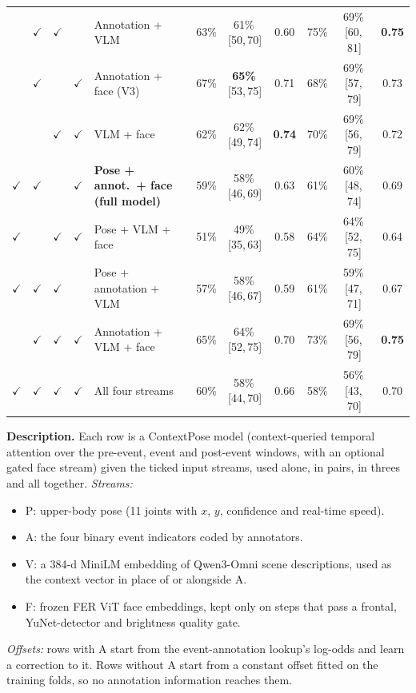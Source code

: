 \documentclass[11pt]{article}
\newcommand{\best}[1]{\textbf{#1}}
\newcommand{\ci}[2]{\,[#1,\,#2]}
\newcommand{\tabledesc}[1]{\par\medskip\begin{minipage}{\linewidth}\footnotesize\textbf{Description.} #1\end{minipage}}
\begin{document}
\begin{table}[!htbp]
{\begin{tabular}{cccclcccccc}
 & $\checkmark$ & $\checkmark$ & & Annotation + VLM & 63\% & 61\%\ci{50}{70} & 0.60 & 75\% & 69\%\ci{60}{81} & \best{0.75} \\
 & $\checkmark$ & & $\checkmark$ & Annotation + face (V3) & 67\% & \best{65\%}\ci{53}{75} & 0.71 & 68\% & 69\%\ci{57}{79} & 0.73 \\
 & & $\checkmark$ & $\checkmark$ & VLM + face & 62\% & 62\%\ci{49}{74} & \best{0.74} & 70\% & 69\%\ci{56}{79} & 0.72 \\
\midrule
$\checkmark$ & $\checkmark$ & & $\checkmark$ & \textbf{Pose + annot.\ + face (full model)} & 59\% & 58\%\ci{46}{69} & 0.63 & 61\% & 60\%\ci{48}{74} & 0.69 \\
$\checkmark$ & & $\checkmark$ & $\checkmark$ & Pose + VLM + face & 51\% & 49\%\ci{35}{63} & 0.58 & 64\% & 64\%\ci{52}{75} & 0.64 \\
$\checkmark$ & $\checkmark$ & $\checkmark$ & & Pose + annotation + VLM & 57\% & 58\%\ci{46}{67} & 0.59 & 61\% & 59\%\ci{47}{71} & 0.67 \\
 & $\checkmark$ & $\checkmark$ & $\checkmark$ & Annotation + VLM + face & 65\% & 64\%\ci{52}{75} & 0.70 & 73\% & 69\%\ci{56}{79} & \best{0.75} \\
\midrule
$\checkmark$ & $\checkmark$ & $\checkmark$ & $\checkmark$ & All four streams & 60\% & 58\%\ci{44}{70} & 0.66 & 58\% & 56\%\ci{43}{70} & 0.70 \\
\bottomrule
\end{tabular}%
}
\tabledesc{Each row is a ContextPose model (context-queried temporal attention over the pre-event, event and post-event windows, with an optional gated face stream) given the ticked input streams, used alone, in pairs, in threes and all together.
\emph{Streams:}
\begin{itemize}
  \item P: upper-body pose (11 joints with $x$, $y$, confidence and real-time speed).
  \item A: the four binary event indicators coded by annotators.
  \item V: a 384-d MiniLM embedding of Qwen3-Omni scene descriptions, used as the context vector in place of or alongside A.
  \item F: frozen FER ViT face embeddings, kept only on steps that pass a frontal, YuNet-detector and brightness quality gate.
\end{itemize}
\emph{Offsets:} rows with A start from the event-annotation lookup's log-odds and learn a correction to it. Rows without A start from a constant offset fitted on the training folds, so no annotation information reaches them.
}
\end{table}
\end{document}
